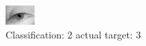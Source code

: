 \begin{figure}[h!]
\begin{center}
\includegraphics[width=0.60\columnwidth]{figures/ID2868_class_2_target_3.png}
\end{center}
\caption{ Classification: 2 actual target: 3}
\label{fig:ID2868_class_2_target_3}
\end{figure}

